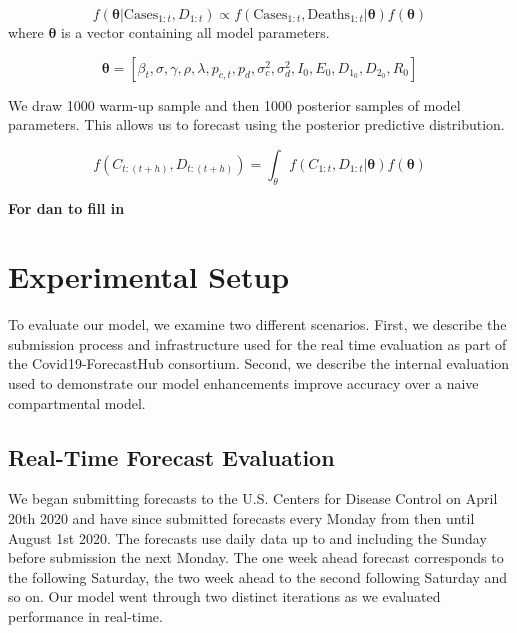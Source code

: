\documentclass[11pt]{amsart}
\begin{document}
\begin{equation}
f(\bm{\theta} | \text{Cases}_{1:t},D_{1:t}) \propto f(\text{Cases}_{1:t},\text{Deaths}_{1:t} | \bm{\theta})f(\bm{\theta})
\end{equation}
where $\bm{\theta}$ is a vector containing all model parameters. 

\begin{equation}
\bm{\theta} =[\beta_{t} ,
\sigma ,
\gamma ,
\rho ,
\lambda ,
p_{c,t} ,
p_{d} ,
\sigma_c^2 ,
\sigma_d^2 ,
I_0 ,
E_0 ,
D_{1_0} ,
D_{2_0} ,
R_0 ]
\end{equation}

We draw 1000 warm-up sample and then 1000 posterior samples of model parameters. This allows us to forecast using the posterior predictive distribution.

\begin{equation}
f(C_{t:(t+h)}, D_{t:(t+h)}) =  \int_{\theta} f(C_{1:t},D_{1:t} | \bm{\theta})f(\bm{\theta})
\end{equation}

\textbf{For dan to fill in}
 \section{Experimental Setup}
 To evaluate our model, we examine two different scenarios. First, we describe the submission process and infrastructure used for the real time evaluation as part of the Covid19-ForecastHub consortium. Second, we describe the internal evaluation used to demonstrate our model enhancements improve accuracy over a naive compartmental model. 
 
 \subsection{Real-Time Forecast Evaluation}
We began submitting forecasts to the U.S. Centers for Disease Control on April 20th 2020 and have since submitted forecasts every Monday from then until August 1st 2020. The forecasts use daily data up to and including the Sunday before submission the next Monday. The one week ahead forecast corresponds to the following Saturday, the two week ahead to the second following Saturday and so on. Our model went through two distinct iterations as we evaluated performance in real-time. 
 
\end{document}
